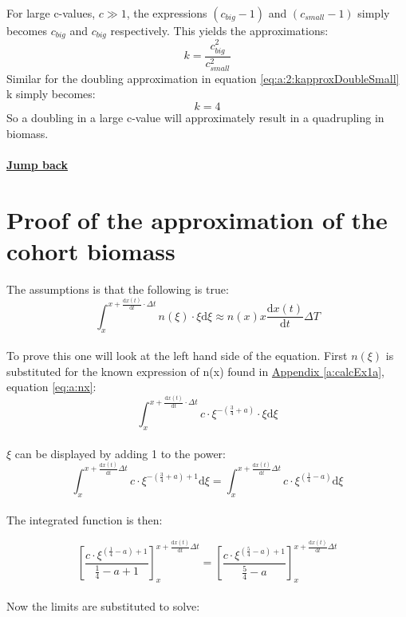 \documentclass{article}
\numberwithin{equation}{section} %
\newcommand{\md}{\mathrm{d}}
\begin{document}
For large c-values, $c \gg 1 $, the expressions $\left(c_{big}-1\right)$ and $\left(c_{small}-1\right)$ simply becomes $c_{big}$ and $c_{big}$ respectively. This yields the approximations:
\begin{equation}\label{eq:a:2:kapproxSmall}
	k = \dfrac{c_{big}^2}{c_{small}^2}
\end{equation}
Similar for the doubling approximation in equation \ref{eq:a:2:kapproxDoubleSmall} k simply becomes:
\begin{equation}\label{eq:a:2:kapproxSmall}
	k = 4
\end{equation}
So a doubling in a large c-value will approximately result in a quadrupling in biomass.\\
\\
\textbf{\hyperref[jmp:a:biomassDifApprox]{Jump back }}

\newpage
\section{Proof of the approximation of the cohort biomass}\label{a:proofBiomassCohort}
The assumptions is that the following is true:
\begin{equation}
  \int_{x}^{x+\tfrac{\md x(t)}{\md t}\cdot\Delta t} n(\xi)\cdot\xi \md \xi \approx n(x)x\dfrac{\md x(t)}{\md t}\Delta T
\end{equation}\\
To prove this one will look at the left hand side of the equation. First $n(\xi)$ is substituted for the known expression of n(x) found in \hyperref[a:calcEx1a]{Appendix \ref{a:calcEx1a}}, equation \ref{eq:a:nx}:
\begin{equation}
    	\int_{x}^{x+\tfrac{\md x(t)}{\md t}\cdot\Delta t} c\cdot\xi^{-(\tfrac{3}{4}+a)}\cdot\xi \md \xi
\end{equation}\\
$\xi$ can be displayed by adding 1 to the power:
    \begin{equation}
    	\int_{x}^{x+\tfrac{\md x(t)}{\md t}\Delta t} c\cdot\xi^{-(\tfrac{3}{4}+a)+1} \md \xi = \int_{x}^{x+\tfrac{\md x(t)}{\md t}\Delta t} c\cdot\xi^{(\tfrac{1}{4}-a)} \md \xi
\end{equation}\\
The integrated function is then:

\begin{equation}
	\left[\dfrac{c\cdot\xi^{(\tfrac{1}{4}-a)+1}}{\tfrac{1}{4}-a+1}\right]_x^{x+\tfrac{\md x(t)}{\md t}\Delta t} = \left[\dfrac{c\cdot\xi^{(\tfrac{5}{4}-a)+1}}{\tfrac{5}{4}-a}\right]_x^{x+\tfrac{\md x(t)}{\md t}\Delta t} 
\end{equation}\\
Now the limits are substituted to solve:
\end{document}
